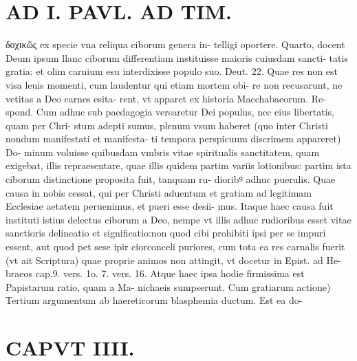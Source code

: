 \documentclass{article}
\begin{document}
\begin{pages}
\section*{AD I. PAVL. AD TIM. }
\marginpar{[ p.194 ]}\pstart δοχικῶς ex specie vna reliqua ciborum genera in- telligi oportere. Quarto, docent Deum ipsum llanc ciborum differentiam instituisse maioris cuiusdam sancti- tatis gratia: et olim carnium esu interdixisse populo suo. Deut. 22. Quae res non est visa leuis momenti, cum laudentur qui etiam mortem obi- re non recusarunt, ne vetitas a Deo carnes esita- rent, vt apparet ex historia Macchabaeorum. Re- spond. Cum adhuc sub paedagogia versaretur Dei populus, nec eius libertatis, quam per Chri- stum adepti sumus, plenum vsum haberet (quo inter Christi nondum manifestati et manifesta- ti tempora perspicuum discrimem appareret) Do- minum voluisse quibusdam vmbris vitae spiritualis sanctitatem, quam exigebat, illis repraesentare, quae illis quidem partim variis lotionibus: partim ista ciborum distinctione proposita fuit, tanquam ru- dioribꝰ adhuc puerulis. Quae causa in nobis cessat, qui per Christi aduentum et gratiam ad legitimam Ecclesiae aetatem peruenimus, et pueri esse desii- mus. Itaque haec causa fuit instituti istius delectus ciborum a Deo, nempe vt illis adhuc rudioribus esset vitae sanctioris delineatio et significatio:non quod cibi prohibiti ipsi per se impuri essent, aut quod pet sese ipir ciorconceli puriores, cum tota ea res carnalis fuerit (vt ait Scriptura) quae proprie animos non attingit, vt docetur in Epist. ad He- braeos cap.9. vers. 1o. 7. vers. 16. Atque haec ipsa hodie firmissima est Papistarum ratio, quam a Ma- nichaeis sumpserunt. Cum gratiarum actione) Tertium argumentum ab haereticorum blasphemia ductum. Est ea do-  \pend
\section*{CAPVT  IIII. }
\marginpar{[ p.195 ]}\pstart {}
{}

\end{pages}
\end{document}
